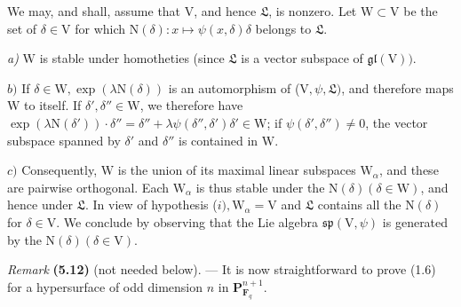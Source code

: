 \documentclass[10pt,leqno]{article}
\begin{document}
\par

\par

\noindent We may, and shall, assume that \(\mathrm{V}\), and hence \(\mathfrak{L} \), is nonzero. Let \(\mathrm{W}\subset \mathrm{V}\) be the set of \(\delta \in \mathrm{V}\) for which \(\mathrm{N}(\delta ):x\longmapsto \psi (x,\delta )\delta \) belongs to \(\mathfrak{L} \).\par

\noindent \emph{a)} \(\mathrm{W}\) is stable under homotheties (since \(\mathfrak{L} \) is a vector subspace of \(\mathfrak{gl}(\mathrm{V}))\).\par

\noindent \(b)\) If \(\delta \in \mathrm{W}, \operatorname{exp}(\lambda \mathrm{N}(\delta ))\) is an automorphism of (\(\mathrm{V},\psi ,\mathfrak{L} )\), and therefore maps \(\mathrm{W}\) to itself. If \(\delta ',\delta ''\in \mathrm{W}\), we therefore have \(\operatorname{exp}(\lambda \mathrm{N}(\delta '))\cdot \delta ''=\delta ''+\lambda \psi (\delta '',\delta ')\delta '\in \mathrm{W}\); if \(\psi (\delta ',\delta '')\ne 0\), the vector subspace spanned by \(\delta '\) and \(\delta ''\) is contained in \(\mathrm{W}\).\par

\clearpage

\label{physical-23}

\noindent \(c)\) Consequently, \(\mathrm{W}\) is the union of its maximal linear subspaces \(\mathrm{W}_{\alpha }\), and these are pairwise orthogonal. Each \(\mathrm{W}_{\alpha }\) is thus stable under the \(\mathrm{N}(\delta ) (\delta \in \mathrm{W})\), and hence under \(\mathfrak{L} \). In view of hypothesis (\(i), \mathrm{W}_{\alpha }=\mathrm{V}\) and \(\mathfrak{L} \) contains all the \(\mathrm{N}(\delta )\) for \(\delta \in \mathrm{V}\). We conclude by observing that the Lie algebra \(\mathfrak{sp}(\mathrm{V},\psi )\) is generated by the \(\mathrm{N}(\delta ) (\delta \in \mathrm{V})\).\par

\noindent \emph{Remark} \textbf{(5.12)} (not needed below). — It is now straightforward to prove (1.6) for a hypersurface of odd dimension \(n\) in \(\mathbf{P}^{n+1}_{\mathbf{F}_{q}}\).\par
\end{document}
